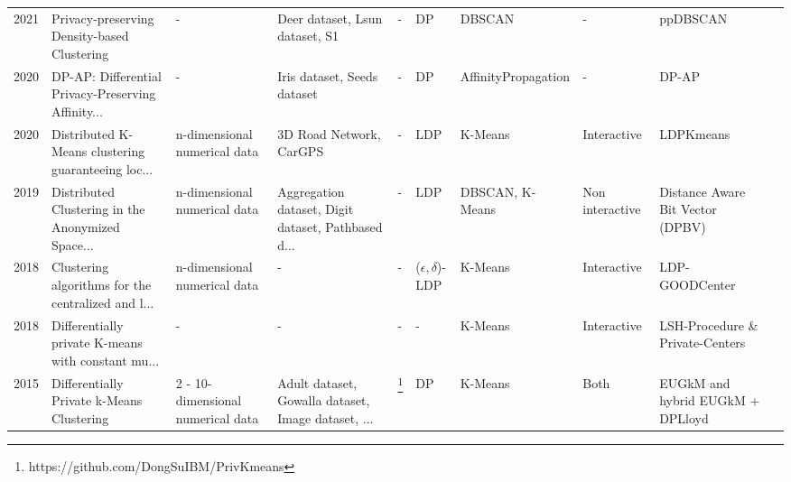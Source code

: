 \begin{landscape}
\begin{table}[ht]
\begin{tabular}{rlllllllll}
      2021 \citep{bozdemir_privacy-preserving_nodate} & Privacy-preserving Density-based Clustering        & -                                 & Deer dataset, Lsun dataset, S1                     & -                                                  & DP                       & DBSCAN              & -               & ppDBSCAN                         \\
      2020 \citep{cai_dp-ap_2020}                     & DP-AP: Differential Privacy-Preserving Affinity... & -                                 & Iris dataset, Seeds dataset                        & -                                                  & DP                       & AffinityPropagation & -               & DP-AP                            \\
      2020 \citep{xia_distributed_2020}               & Distributed K-Means clustering guaranteeing loc... & n-dimensional numerical data      & 3D Road Network, CarGPS                            & -                                                  & LDP                      & K-Means             & Interactive     & LDPKmeans                        \\
      2019 \citep{sun_distributed_2019}               & Distributed Clustering in the Anonymized Space...  & n-dimensional numerical data      & Aggregation dataset, Digit dataset, Pathbased d... & -                                                  & LDP                      & DBSCAN, K-Means     & Non interactive & Distance Aware Bit Vector (DPBV) \\
      2018 \citep{nissim_clustering_2018}             & Clustering algorithms for the centralized and l... & n-dimensional numerical data      & -                                                  & -                                                  & ($\epsilon, \delta$)-LDP & K-Means             & Interactive     & LDP-GOODCenter                   \\
      2018 \citep{nissim_clustering_2018}             & Differentially private K-means with constant mu... & -                                 & -                                                  & -                                                  & -                        & K-Means             & Interactive     & LSH-Procedure \& Private-Centers \\
      2015 \citep{su_differentially_2015}             & Differentially Private k-Means Clustering          & 2 - 10-dimensional numerical data & Adult dataset, Gowalla dataset, Image dataset, ... & \footnote{https://github.com/DongSuIBM/PrivKmeans} & DP                       & K-Means             & Both            & EUGkM and hybrid EUGkM + DPLloyd \\

\end{tabular}
\end{table}
\end{landscape}
